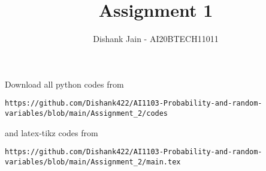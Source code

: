 \documentclass[journal,12pt,twocolumn]{IEEEtran}
\DeclareMathOperator*{\Res}{Res}
\begin{document}
\newcommand{\BEQA}{\begin{eqnarray}}
\newcommand{\EEQA}{\end{eqnarray}}
\newcommand{\define}{\stackrel{\triangle}{=}}

\raggedbottom
\setlength{\parindent}{0pt}
\providecommand{\mbf}{\mathbf}
\providecommand{\pr}[1]{\ensuremath{\Pr\left(#1\right)}}
\providecommand{\qfunc}[1]{\ensuremath{Q\left(#1\right)}}
\providecommand{\sbrak}[1]{\ensuremath{{}\left[#1\right]}}
\providecommand{\lsbrak}[1]{\ensuremath{{}\left[#1\right.}}
\providecommand{\rsbrak}[1]{\ensuremath{{}\left.#1\right]}}
\providecommand{\brak}[1]{\ensuremath{\left(#1\right)}}
\providecommand{\lbrak}[1]{\ensuremath{\left(#1\right.}}
\providecommand{\rbrak}[1]{\ensuremath{\left.#1\right)}}
\providecommand{\cbrak}[1]{\ensuremath{\left\{#1\right\}}}
\providecommand{\lcbrak}[1]{\ensuremath{\left\{#1\right.}}
\providecommand{\rcbrak}[1]{\ensuremath{\left.#1\right\}}}
\theoremstyle{remark}
\newtheorem{rem}{Remark}
\newcommand{\sgn}{\mathop{\mathrm{sgn}}}
\providecommand{\abs}[1]{\vert#1\vert}
\providecommand{\res}[1]{\Res\displaylimits_{#1}} 
\providecommand{\norm}[1]{\lVert#1\rVert}
\providecommand{\mtx}[1]{\mathbf{#1}}
\providecommand{\mean}[1]{E[ #1 ]}
\providecommand{\fourier}{\overset{\mathcal{F}}{ \rightleftharpoons}}
\providecommand{\system}{\overset{\mathcal{H}}{ \longleftrightarrow}}
\newcommand{\solution}{\noindent \textbf{Solution: }}
\newcommand{\cosec}{\,\text{cosec}\,}
\providecommand{\dec}[2]{\ensuremath{\overset{#1}{\underset{#2}{\gtrless}}}}
\newcommand{\myvec}[1]{\ensuremath{\begin{pmatrix}#1\end{pmatrix}}}
\newcommand{\mydet}[1]{\ensuremath{\begin{vmatrix}#1\end{vmatrix}}}
\makeatletter
{}
\makeatother
\let\StandardTheFigure\thefigure
\let\vec\mathbf
\renewcommand{\thefigure}{\theproblem}
\def\putbox#1#2#3{\makebox[0in][l]{\makebox[#1][l]{}\raisebox{\baselineskip}[0in][0in]{\raisebox{#2}[0in][0in]{#3}}}}
     \def\rightbox#1{\makebox[0in][r]{#1}}
     \def\centbox#1{\makebox[0in]{#1}}
     \def\topbox#1{\raisebox{-\baselineskip}[0in][0in]{#1}}
     \def\midbox#1{\raisebox{-0.5\baselineskip}[0in][0in]{#1}}
\vspace{3cm}
\title{Assignment 1}
\author{Dishank Jain - AI20BTECH11011}
\maketitle
\newpage
\bigskip
\renewcommand{\thefigure}{\theenumi}
\renewcommand{\thetable}{\theenumi}
Download all python codes from 
\begin{lstlisting}
https://github.com/Dishank422/AI1103-Probability-and-random-variables/blob/main/Assignment_2/codes
\end{lstlisting}
%
and latex-tikz codes from 
%
\begin{lstlisting}
https://github.com/Dishank422/AI1103-Probability-and-random-variables/blob/main/Assignment_2/main.tex
\end{lstlisting}
\end{document}
